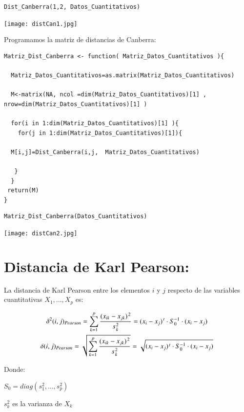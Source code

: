 \documentclass[12pt]{report} %
\begin{document}
\begin{lstlisting}
Dist_Canberra(1,2, Datos_Cuantitativos)
\end{lstlisting}

\texttt{[image: distCan1.jpg]}

Programamos la  matriz de distancias  de Canberra:

\begin{lstlisting}
Matriz_Dist_Canberra <- function( Matriz_Datos_Cuantitativos ){
  
  Matriz_Datos_Cuantitativos=as.matrix(Matriz_Datos_Cuantitativos)
  
  M<-matrix(NA, ncol =dim(Matriz_Datos_Cuantitativos)[1] , nrow=dim(Matriz_Datos_Cuantitativos)[1] )
  
  for(i in 1:dim(Matriz_Datos_Cuantitativos)[1] ){
    for(j in 1:dim(Matriz_Datos_Cuantitativos)[1]){
    
  M[i,j]=Dist_Canberra(i,j,  Matriz_Datos_Cuantitativos)
  
   }
  }
 return(M)
}
\end{lstlisting}

\newpage


\begin{lstlisting}
Matriz_Dist_Canberra(Datos_Cuantitativos)
\end{lstlisting}

\texttt{[image: distCan2.jpg]}

\newpage
 
 
 
 

\section{Distancia de Karl Pearson:}

\begin{tcolorbox}[toptitle=2mm,title= Distancia de Pearson:   ]
La distancia de Karl Pearson entre los elementos $i$ y $j$ respecto de las variables cuantitativas $X_1,...,X_p$ es:

\begin{gather*}
 \delta^2(i,j)_{Pearson}= \sum_{k=1}^{p} \dfrac{( x_{ik} - x_{jk} )\hspace{0.03cm}^2 }{s\hspace{0.03cm}^2_k} = (x_i - x_j)\hspace{0.03cm}^t \cdot S_0^{-1} \cdot (x_i - x_j )  \\
 \delta(i,j)_{Pearson}= \sqrt{ \sum_{k=1}^{p} \dfrac{( x_{ik} - x_{jk} )\hspace{0.03cm}^2 }{s\hspace{0.03cm}^2_k}} = \sqrt{(x_i - x_j)\hspace{0.03cm}^t \cdot S_0^{-1} \cdot (x_i - x_j )} 
 \end{gather*}
 
 Donde:
 
 $S_0 = diag(s_1 ^2 ,..., s_p ^2)$
 
 $s_k ^2$ es la varianza de $X_k$

\end{tcolorbox}
\end{document}
